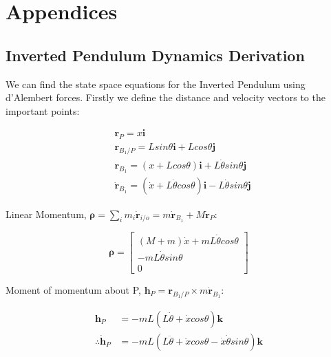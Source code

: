\documentclass[../main.tex]{subfiles}
\begin{document}
\chapter{Appendices}
\section{Inverted Pendulum Dynamics Derivation}
\label{appendix:invpen}

We can find the state space equations for the Inverted Pendulum using d'Alembert forces. Firstly we define the distance and velocity vectors to the important points:

\begin{align*}
    & \boldsymbol{r}_P = x \boldsymbol{i} \\
    & \boldsymbol{r}_{B_1/P} = L sin \theta \boldsymbol{i} + L cos \theta \boldsymbol{j} \\
    & \boldsymbol{r}_{B_1} = (x+L cos \theta)\boldsymbol{i}+L \dot{\theta} sin \theta  \boldsymbol{j} \\
    & \dot{\boldsymbol{r}}_{B_1} = (\dot{x} + L\dot{\theta}cos\theta)\boldsymbol{i} - L\dot{\theta}sin\theta \boldsymbol{j}
\end{align*}

Linear Momentum, $\boldsymbol{\rho} = \sum_i m_i \dot{\boldsymbol{r}}_{i/o} = m \dot{\boldsymbol{r}}_{B_1} + M \dot{\boldsymbol{r}}_{P}$:

\begin{equation*}
\boldsymbol{\rho} = 
\begin{bmatrix} (M+m)\dot{x} + m L\dot{\theta}cos{\theta} \\ -m L\dot{\theta}sin{\theta} \\ 0 \end{bmatrix} 
\end{equation*}

Moment of momentum about P, $\boldsymbol{h}_P = \boldsymbol{r}_{B_1/P} \times m \boldsymbol{\dot{r}}_{B_1}$:

\begin{align*}
\boldsymbol{h}_P & = -m L(L\dot{\theta} + \dot{x}cos\theta) \boldsymbol{k} \\
\therefore \boldsymbol{\dot{h}}_P & = -mL(L\ddot{\theta} + \ddot{x}cos\theta - \dot{x}\dot{\theta}sin\theta) \boldsymbol{k}
\end{align*}
\end{document}
